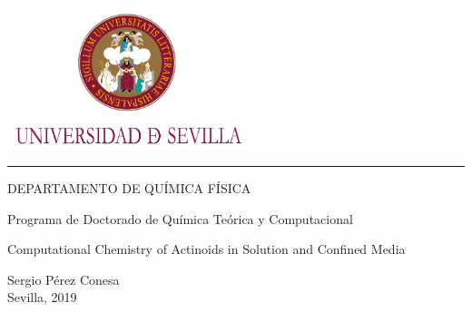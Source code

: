 \documentclass[b5paper,11pt,twoside,showtrims,openright]{memoir} %
\begin{document}
\begin{center}
\includegraphics[width=7cm]{./images/logotipo.jpeg}
\rule{\textwidth}{1.2pt}
DEPARTAMENTO DE QUÍMICA FÍSICA
\par
Programa de Doctorado de Química Teórica y Computacional

\vspace{4cm}

\begin{DoubleSpace}{\LARGE Computational Chemistry of Actinoids in Solution and Confined Media}
\end{DoubleSpace}
\end{center}

\vspace{2cm}

\begin{flushright}
{\Large
Sergio Pérez Conesa}\\
{\large Sevilla, 2019}
\end{flushright}


\newpage
\mbox{}
\thispagestyle{empty} %

\newpage
\thispagestyle{empty}
\end{document}
